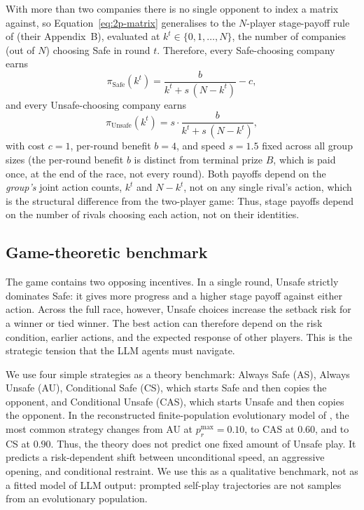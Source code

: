 \documentclass[sigconf]{aamas}
\begin{document}
With more than two companies there is no single opponent to index a matrix against, so Equation~\ref{eq:2p-matrix} generalises to the $N$-player stage-payoff rule of \citet{to_regulate_or_not} (their Appendix~B), evaluated at $k^t \in \{0,1,\dots,N\}$, the number of companies (out of $N$) choosing Safe in round $t$. Therefore, every Safe-choosing company earns
\begin{equation}
    \pi_{\text{Safe}}(k^t) = \frac{b}{k^t + s\,(N-k^t)} - c,
    \label{eq:np-safe}
\end{equation}
and every Unsafe-choosing company earns
\begin{equation}
    \pi_{\text{Unsafe}}(k^t) = s \cdot \frac{b}{k^t + s\,(N-k^t)},
    \label{eq:np-unsafe}
\end{equation}
with cost $c=1$, per-round benefit $b=4$, and speed $s=1.5$ fixed across all group sizes (the per-round benefit $b$ is distinct from terminal prize $B$, which is paid once, at the end of the race, not every round). Both payoffs depend on the \emph{group's} joint action counts, $k^t$ and $N-k^t$, not on any single rival's action, which is the structural difference from the two-player game: Thus, stage payoffs depend on the number of rivals choosing each action,
not on their identities.

\subsection{Game-theoretic benchmark}
\label{sec:theory-benchmark}

The game contains two opposing incentives. In a single round, Unsafe strictly
dominates Safe: it gives more progress and a higher stage payoff against either
action. Across the full race, however, Unsafe choices increase the setback risk
for a winner or tied winner. The best action can therefore depend on the risk
condition, earlier actions, and the expected response of other players. This is
the strategic tension that the LLM agents must navigate.

We use four simple strategies as a theory benchmark: Always Safe (AS), Always
Unsafe (AU), Conditional Safe (CS), which starts Safe and then copies the
opponent, and Conditional Unsafe (CAS), which starts Unsafe and then copies the
opponent. In the reconstructed finite-population evolutionary model of
\citet{falling_behind_unsafe}, the most common strategy changes from AU at
$p_r^{\max}=0.10$, to CAS at $0.60$, and to CS at $0.90$. Thus, the theory does
not predict one fixed amount of Unsafe play. It predicts a risk-dependent shift
between unconditional speed, an aggressive opening, and conditional restraint.
We use this as a qualitative benchmark, not as a fitted model of LLM output:
prompted self-play trajectories are not samples from an evolutionary population.
\end{document}
